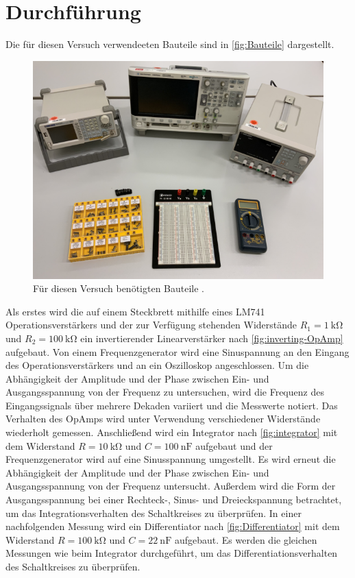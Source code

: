 \section{Durchführung}
\label{sec:Durchführung}

Die für diesen Versuch verwendeeten Bauteile sind in \autoref{fig:Bauteile} dargestellt.
\begin{figure}[H]
    \centering
    \includegraphics[width=0.4\linewidth]{figures/Aufbau.png}
    \caption{Für diesen Versuch benötigten Bauteile \cite{Anleitung51}.}
    \label{fig:Bauteile}
\end{figure}
\noindent
Als erstes wird die auf einem Steckbrett mithilfe eines LM741 Operationsverstärkers und der zur Verfügung stehenden Widerstände $R_1=\SI{1}{\kilo\ohm}$ und $R_2=\SI{100}{\kilo\ohm}$ ein invertierender Linearverstärker nach \autoref{fig:inverting-OpAmp} aufgebaut.
Von einem Frequenzgenerator wird eine Sinuspannung an den Eingang des Operationsverstärkers und an ein Oszilloskop angeschlossen.
Um die Abhängigkeit der Amplitude und der Phase zwischen Ein- und Ausgangsspannung von der Frequenz zu untersuchen, wird die Frequenz des Eingangssignals über mehrere Dekaden variiert und die Messwerte notiert.
Das Verhalten des OpAmps wird unter Verwendung verschiedener Widerstände wiederholt gemessen. \newline
Anschließend wird ein Integrator nach \autoref{fig:integrator} mit dem Widerstand $R=\SI{10}{\kilo\ohm}$ und $C=\SI{100}{\nano\farad}$ aufgebaut und der Frequenzgenerator wird auf eine Sinusspannung umgestellt.
Es wird erneut die Abhängigkeit der Amplitude und der Phase zwischen Ein- und Ausgangsspannung von der Frequenz untersucht.
Außerdem wird die Form der Ausgangsspannung bei einer Rechteck-, Sinus- und Dreieckspannung betrachtet, um das Integrationsverhalten des Schaltkreises zu überprüfen. \newline
In einer nachfolgenden Messung wird ein Differentiator nach \autoref{fig:Differentiator} mit dem Widerstand $R=\SI{100}{\kilo\ohm}$ und $C=\SI{22}{\nano\farad}$ aufgebaut.
Es werden die gleichen Messungen wie beim Integrator durchgeführt, um das Differentiationsverhalten des Schaltkreises zu überprüfen.

